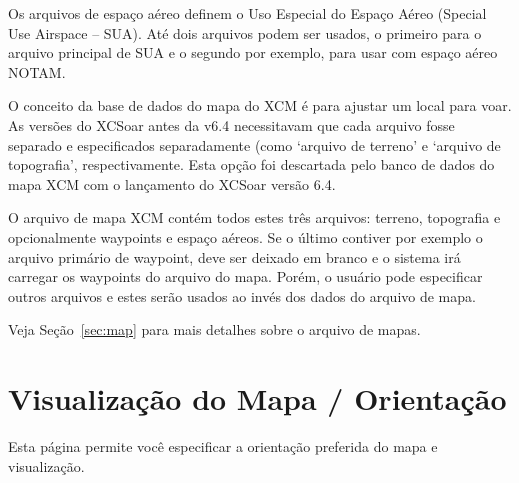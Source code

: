 Os arquivos de espaço aéreo definem o Uso Especial do Espaço Aéreo (Special Use Airspace – SUA).  Até dois arquivos podem ser usados, o primeiro para o arquivo principal de SUA e o segundo por exemplo, para usar com espaço aéreo NOTAM.

O conceito da base de dados do mapa do XCM é para ajustar um local para voar.  As versões do XCSoar antes da v6.4 necessitavam que cada arquivo fosse separado e especificados separadamente (como ‘arquivo de terreno’ e ‘arquivo de topografia’, respectivamente.  Esta opção foi descartada pelo banco de dados do mapa XCM com o lançamento do XCSoar versão 6.4.

O arquivo de mapa XCM contém todos estes três arquivos: terreno, topografia e opcionalmente waypoints e espaço aéreos.  Se o último contiver por exemplo o arquivo primário de waypoint, deve ser deixado em branco e o sistema irá carregar os waypoints do arquivo do mapa.  Porém, o usuário pode especificar outros arquivos e estes serão usados ao invés dos dados do arquivo de mapa.

Veja Seção~\ref{sec:map} para mais detalhes sobre o arquivo de mapas.  


\section{Visualização do Mapa / Orientação}\label{sec:map-projection}

Esta página permite você especificar a orientação preferida do mapa e visualização.

